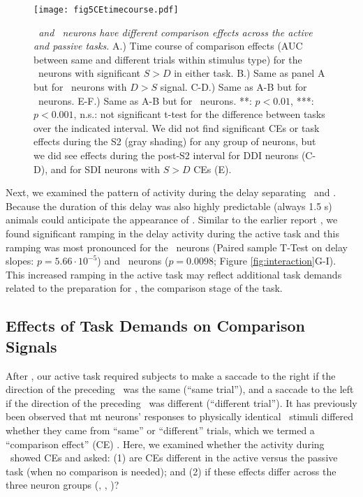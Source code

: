 	\begin{figure}
		\captionsetup{singlelinecheck = false, font=footnotesize, labelsep=space}
		\centering
		\texttt{[image: fig5CEtimecourse.pdf]}
		\caption{{\it \suppressed\ and \consistent\ neurons have different comparison effects across the active and passive tasks.} A.) Time course of comparison effects (AUC between same and different trials within stimulus type) for the \enhanced\ neurons with significant $S>D$ in either task. B.) Same as panel A but for \enhanced\ neurons with $D>S$ signal. C-D.) Same as A-B but for \suppressed\ neurons. E-F.) Same as A-B but for \consistent\ neurons. **: $p<0.01$, ***: $p<0.001$, n.s.: not significant t-test for the difference between tasks over the indicated interval. We did not find significant CEs or task effects during the S2 (gray shading) for any group of neurons, but we did see effects during the post-S2 interval for DDI neurons (C-D), and for SDI neurons with $S>D$ CEs (E). }
		\label{fig:CEtimecourses}
	\end{figure}



Next, we examined the pattern of activity during the delay separating \sample\ and \test. Because the duration of this delay was also highly predictable (always 1.5 s) animals could anticipate the appearance of \test.
Similar to the earlier report \parencite{Bisley2004}, we found significant ramping in the delay activity during the active task and this ramping was most pronounced for the \enhanced\ neurons (Paired sample T-Test on delay slopes: $p=5.66\cdot10^{-5}$) and \consistent\ neurons ($p=0.0098$; Figure \ref{fig:interaction}G-I).  This increased ramping in the active task may reflect additional task demands related to the preparation for \test, the comparison stage of the task.

\subsection*{Effects of Task Demands on Comparison Signals}
After \test, our active task required subjects to make a saccade to the right if the direction of the preceding \sample\ was the same (``same trial''), and a saccade to the left if the direction of the preceding \sample\ was different (``different trial''). It has previously been observed that \gls{mt} neurons' responses to physically identical \test\ stimuli differed whether they came from ``same'' or ``different'' trials, which we termed a ``comparison effect'' (CE)  \parencite{Lui2011,Zaksas2006}. 
Here, we examined whether the activity during \test\ showed CEs and asked: (1) are CEs different in the active versus the passive task (when no comparison is needed); and (2) if these effects differ across the three neuron groups (\enhanced, \suppressed, \consistent)?

